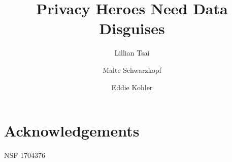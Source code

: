 \documentclass[sigconf,natbib=false,10pt]{acmart}
\newcommand\lyt[1]{\textcolor{green!55!blue}{[lyt: {#1}]}}
\begin{document}

\date{}

\title{Privacy Heroes Need Data Disguises}

\author{Lillian Tsai}
\affiliation{%
  \institution{MIT CSAIL}
  \country{}
}
\author{Malte Schwarzkopf}
\affiliation{%
  \institution{Brown University}
  \country{}
}
\author{Eddie Kohler}
\affiliation{%
  \institution{Harvard University}
  \country{}
}



\maketitle






%
%





\section*{Acknowledgements}

NSF 1704376

%

\printbibliography

\end{document}
